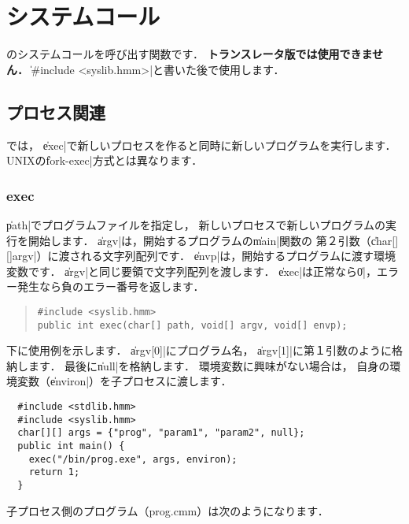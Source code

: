 %
%
\chapter{システムコール}

\tacos のシステムコールを呼び出す関数です．
{\bf トランスレータ版では使用できません．}
\|#include <syslib.hmm>|と書いた後で使用します．

\section{プロセス関連}

\tacos では，
\|exec|で新しいプロセスを作ると同時に新しいプログラムを実行します．
UNIXの\|fork-exec|方式とは異なります．


\subsection{exec}

\|path|でプログラムファイルを指定し，
新しいプロセスで新しいプログラムの実行を開始します．
\|argv|は，開始するプログラムの\|main|関数の
第２引数（\|char[][]argv|）に渡される文字列配列です．
\|envp|は，開始するプログラムに渡す環境変数です．
\|argv|と同じ要領で文字列配列を渡します．
\|exec|は正常なら\|0|，エラー発生なら負のエラー番号を返します．

\begin{quote}
\begin{verbatim}
#include <syslib.hmm>
public int exec(char[] path, void[] argv, void[] envp);
\end{verbatim}
\end{quote}

下に使用例を示します．
\|argv[0]|にプログラム名，
\|argv[1]|に第１引数のように格納します．
最後に\|null|を格納します．
環境変数に興味がない場合は，
自身の環境変数（\|environ|）を子プロセスに渡します．

\begin{mylist}
\begin{verbatim}
  #include <stdlib.hmm>
  #include <syslib.hmm>
  char[][] args = {"prog", "param1", "param2", null};
  public int main() {
    exec("/bin/prog.exe", args, environ);
    return 1;
  }
\end{verbatim}
\end{mylist}

子プロセス側のプログラム（prog.cmm）は次のようになります．

